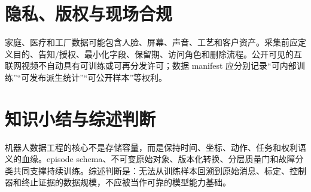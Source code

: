 \section{隐私、版权与现场合规}

家庭、医疗和工厂数据可能包含人脸、屏幕、声音、工艺和客户资产。采集前应定义目的、告知/授权、最小化字段、保留期、访问角色和删除流程。公开可见的互联网视频不自动具有可训练或可再分发许可；数据 manifest 应分别记录“可内部训练”“可发布派生统计”“可公开样本”等权利。

\section{知识小结与综述判断}

机器人数据工程的核心不是存储容量，而是保持时间、坐标、动作、任务和权利语义的血缘。episode schema、不可变原始对象、版本化转换、分层质量门和故障分类共同支撑持续训练。综述判断是：无法从训练样本回溯到原始消息、标定、控制器和终止证据的数据规模，不应被当作可靠的模型能力基础。

